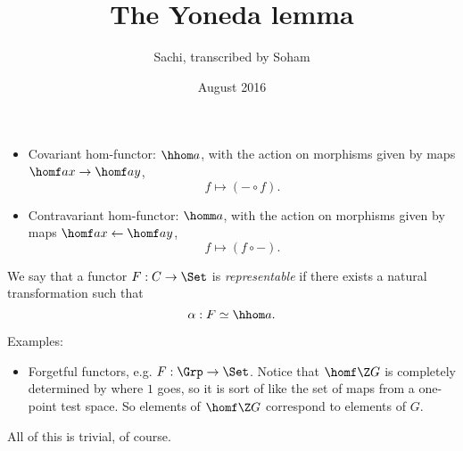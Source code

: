 \documentclass{article}
\title{The Yoneda lemma}
\author{Sachi, transcribed by Soham}
\date{August 2016}
\begin{document}
\maketitle


\begin{itemize}
\item Covariant hom-functor: $\hhom a$, with the action on morphisms given by
  maps $\homf a x\to\homf a y$, $$f\mapsto (-\circ f).$$
\item Contravariant hom-functor: $\homm a$, with the action on morphisms given by
  maps $\homf a x\leftarrow\homf a y$, $$f\mapsto (f\circ -).$$
\end{itemize}

\begin{defn}
 We say that a functor $F: C\to\Set$ is \textit{representable} if there exists a
 natural transformation such that
 $$\alpha: F\simeq\hhom a.$$
\end{defn}

Examples:
\begin{itemize}
\item Forgetful functors, e.g. $F: \Grp\to\Set$. Notice that $\homf \Z G$ is
  completely determined by where $1$ goes, so it is sort of like the set of maps
  from a one-point test space. So elements of $\homf\Z G$ correspond to elements
  of $G$.
\end{itemize}

All of this is trivial, of course.
\end{document}
